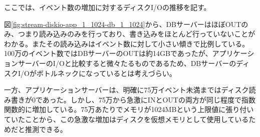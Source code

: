 \documentclass[../../../../../main]{subfiles}
\begin{document}
    \label{subsubsec:result-streaming-only-limit-diskio}

    ここでは、イベント数の増加に対するディスクI/Oの推移を記す。

    

    図\ref{fig:stream-diskio-app_1_1024-db_1_1024}から、DBサーバーはほぼOUTのみ、つまり読み込みのみを行っており、書き込みをほとんど行っていないことがわかる。またその読み込みはイベント数に対して小さい傾きで比例している。100万のイベント数ではDBサーバーのOUTは約14GBであったが、アプリケーションサーバーのI/Oと比較すると微々たるものであるため、DBサーバーのディスクI/Oがボトルネックになっているとは考えづらい。

    一方、アプリケーションサーバーは、明確に75万イベント未満まではディスク読み書きが0であった。しかし、75万から急激にINとOUTの両方が同じ程度で指数関数的に増加している。75万あたりでメモリが1024MBという上限値に張り付いていたことから、この急激な増加はディスクを仮想メモリとして使用しているためだと推測できる。
\end{document}
